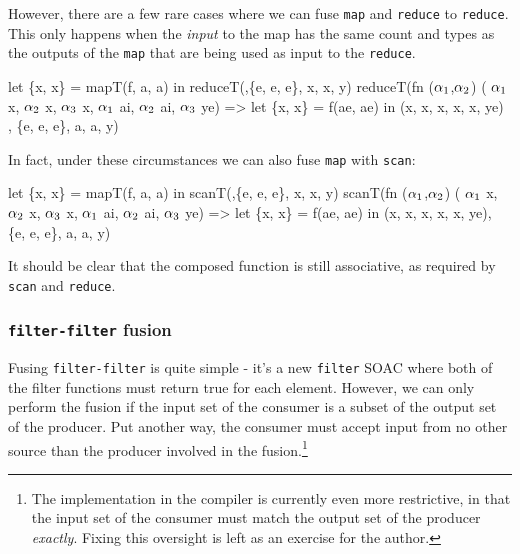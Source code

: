 However, there are a few rare cases where we can fuse \texttt{map} and
\texttt{reduce} to \texttt{reduce}.  This only happens when the
\textit{input} to the map has the same count and types as the outputs
of the \texttt{map} that are being used as input to the
\texttt{reduce}.

\begin{colorcode}
let \{x, x\} = mapT(f, a, a)
in  reduceT(\mymath{\oplus},\{e, e, e\}, x, x, y)
    \emphh{\mymath{\Downarrow}}
reduceT(fn (\(\alpha_{1}\),\(\alpha_{2}\)) ( \(\alpha_{1}\) x, \(\alpha_{2}\) x, \(\alpha_{3}\) x,
            \(\alpha_{1}\) ai, \(\alpha_{2}\) ai, \(\alpha_{3}\) ye) =>
          let \{x, x\} = f(ae, ae)
          in  \mymath{\oplus}(x, x, x, x, x, ye)
        , \{e, e, e\}, a, a, y)
\end{colorcode}

In fact, under these circumstances we can also fuse \texttt{map} with
\texttt{scan}:

\begin{colorcode}
let \{x, x\} = mapT(f, a, a)
in  scanT(\mymath{\oplus},\{e, e, e\}, x, x, y)
    \emphh{\mymath{\Downarrow}}
scanT(fn (\(\alpha_{1}\),\(\alpha_{2}\)) ( \(\alpha_{1}\) x, \(\alpha_{2}\) x, \(\alpha_{3}\) x,
          \(\alpha_{1}\) ai, \(\alpha_{2}\) ai, \(\alpha_{3}\) ye) =>
        let \{x, x\} = f(ae, ae)
        in  \mymath{\oplus}(x, x, x, x, x, ye),
      \{e, e, e\}, a, a, y)
\end{colorcode}

It should be clear that the composed function is still associative, as
required by \texttt{scan} and \texttt{reduce}.

\subsubsection{\texttt{filter-filter} fusion}

Fusing \texttt{filter-filter} is quite simple - it's a new
\texttt{filter} SOAC where both of the filter functions must return
true for each element.  However, we can only perform the fusion if the
input set of the consumer is a subset of the output set of the
producer.  Put another way, the consumer must accept input from no
other source than the producer involved in the fusion.\footnote{The
  implementation in the \LO{} compiler is currently even more
  restrictive, in that the input set of the consumer must match the
  output set of the producer \textit{exactly}.  Fixing this oversight
  is left as an exercise for the author.}

